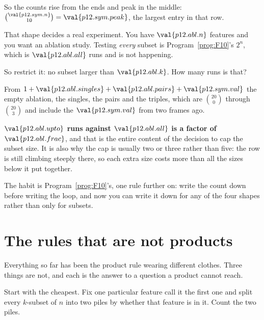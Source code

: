 \begin{fr}
So the counts rise from the ends and peak in the middle:
$\binom{\val{p12.sym.n}}{10} = \val{p12.sym.peak}$, the largest entry in that
row.

That shape decides a real experiment. You have $\val{p12.abl.n}$ features and
you want an ablation study. Testing \emph{every} subset is
Program~\ref{prog:F10}'s $2^{n}$, which is $\val{p12.abl.all}$ runs and is not
happening.

So restrict it: no subset larger than $\val{p12.abl.k}$. How many runs is
that?
\dotline
\nextframe
\end{fr}

\begin{fr}
From $1 + \val{p12.abl.singles} + \val{p12.abl.pairs} + \val{p12.sym.val}$
\dash{} the empty ablation, the singles, the pairs and the triples, which are
$\binom{20}{0}$ through $\binom{20}{3}$ and include the $\val{p12.sym.val}$
from two frames ago.

\textbf{$\val{p12.abl.upto}$ runs against $\val{p12.abl.all}$ is a factor of
$\val{p12.abl.frac}$}, and that is the entire content of the decision to cap
the subset size. It is also why the cap is usually two or three rather than
five: the row is still climbing steeply there, so each extra size costs more
than all the sizes below it put together.

The habit is Program~\ref{prog:F10}'s, one rule further on: write the count
down before writing the loop, and now you can write it down for any of the
four shapes rather than only for subsets.
\end{fr}

\section{The rules that are not products}
\label{sec:P12-not-products}

\begin{fr}
Everything so far has been the product rule wearing different clothes. Three
things are not, and each is the answer to a question a product cannot reach.

Start with the cheapest. Fix one particular feature \dash{} call it the first
one \dash{} and split every $k$-subset of $n$ into two piles by whether that
feature is in it. Count the two piles.
\nextframe
\end{fr}

